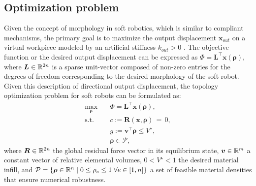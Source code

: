 \subsection{Optimization problem}
Given the concept of morphology in soft robotics, which is similar to compliant mechanisms, the primary goal is to maximize the output displacement $\boldsymbol{x}_{out}$ on a virtual workpiece modeled by an artificial stiffness $k_{out} > 0$ \cite{Bendsoe2003,Gain2013Dec}. The objective function or the desired output displacement can be expressed as $\Phi = \boldsymbol{L}^\top\boldsymbol{x}(\boldsymbol{\rho})$, where $\boldsymbol{L} \in \mathbb{R}^{2n}$ is a sparse unit-vector composed of non-zero entries for the degrees-of-freedom corresponding to the desired morphology of the soft robot. Given this description of directional output displacement, the topology optimization problem for soft robots can be formulated as:
\begin{equation}
\begin{aligned}
\max_{\boldsymbol{\rho}} \quad &  \Phi = \boldsymbol{L}^\top \boldsymbol{x}(\boldsymbol{\rho}), \\
\textrm{s.t.} \quad & c:=\boldsymbol{R}(\boldsymbol{x},\boldsymbol{\rho}) \,= \,0,\\
& g:=\boldsymbol{v}^\top \boldsymbol{\rho}  \le V^\star, \\
  &\boldsymbol{\rho} \in \mathcal{P},
  \label{eq:opt}
\end{aligned}
\end{equation}
where $\boldsymbol{R} \in \mathbb{R}^{2n}$ the global residual force vector in its equilibrium state, $\boldsymbol{v} \in \mathbb{R}^{m}$ a constant vector of relative elemental volumes, $ 0 < V^\star < 1$ the desired material infill, and $\mathcal{P} = \{\boldsymbol{\rho} \in \mathbb{R}^n \; | \; 0  \le \rho_e \le 1 \; \forall e \in [1,n] \}$ a set of feasible material densities that ensure numerical robustness.

